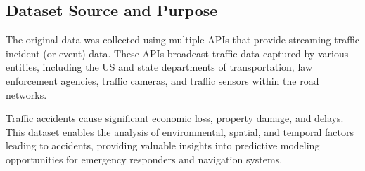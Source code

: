 \documentclass[11pt,a4paper]{article}
\begin{document}
\subsection*{Dataset Source and Purpose}
The original data was collected using multiple APIs that provide streaming traffic incident (or event) data. These APIs broadcast traffic data captured by various entities, including the US and state departments of transportation, law enforcement agencies, traffic cameras, and traffic sensors within the road networks. 

Traffic accidents cause significant economic loss, property damage, and delays. This dataset enables the analysis of environmental, spatial, and temporal factors leading to accidents, providing valuable insights into predictive modeling opportunities for emergency responders and navigation systems.
\end{document}
